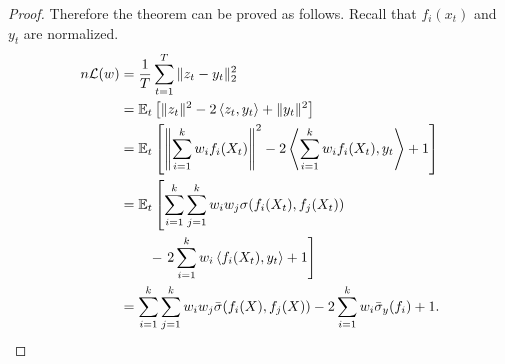 \begin{proof}
Therefore the theorem can be proved as follows. Recall that $f_i(x_t)$ and $y_t$ are normalized.
\begin{equation}
    \begin{aligned}
        n\mathcal{L}(w)
        & = \frac{1}{T} \sum_{t=1}^T \|z_t - y_t\|_2^2 \\
        & = \mathbb{E}_{t}\left[\|z_t\|^2 - 2\left\langle z_t, y_t\right\rangle + \|y_t\|^2\right] \\
        & = \mathbb{E}_{t}\left[
            \left\Vert \sum_{i=1}^k w_if_i(X_t)\right\Vert^2
            - 2 \left\langle \sum_{i=1}^k w_if_i(X_t), y_t\right\rangle
            + 1
        \right] \\
        & = \mathbb{E}_t\left[ \sum_{i=1}^k\sum_{j=1}^k w_iw_j \sigma(f_i(X_t), f_j(X_t))\right. \\
        & \qquad \left. -\ 2\sum_{i=1}^k w_i\left\langle f_i(X_t), y_t\right\rangle + 1 \right] \\
        & = \sum_{i=1}^k\sum_{j=1}^k w_iw_j \bar{\sigma}(f_i(X), f_j(X)) - 2\sum_{i=1}^k w_i \bar{\sigma}_y(f_i) + 1.
    \end{aligned}
\end{equation}

\end{proof}
